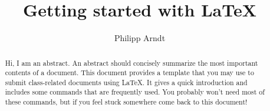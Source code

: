 \documentclass[letterus,times]{SIOpset}
\begin{document}
 

\title{Getting started with \LaTeX}

\author{Philipp Arndt}




\begin{abstract}
Hi, I am an abstract. An abstract should concisely summarize the most important contents of a document. This document provides a template that you may use to submit class-related documents using \LaTeX. It gives a quick introduction and includes some commands that are frequently used. You probably won't need most of these commands, but if you feel stuck somewhere come back to this document! 
\end{abstract}
 
\maketitle

\allowdisplaybreaks
\hypersetup{colorlinks=true, linkcolor=blue}
\renewcommand\thesubsection{\thesection\alph{subsection}}
\renewcommand\thesubsubsection{\thesection\alph{subsection}.\roman{subsubsection}}
\setcounter{secnumdepth}{3} %

\end{document}
